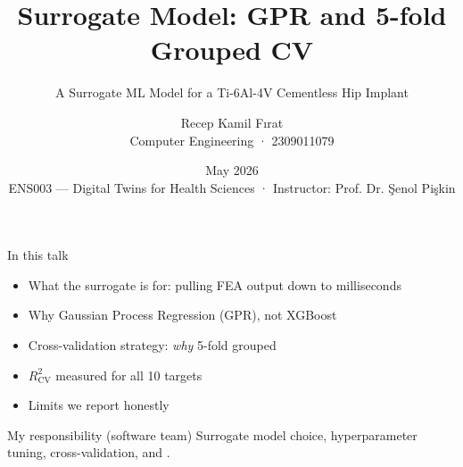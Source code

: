 

\newcommand{\courseHeader}{ENS003 --- Digital Twins for Health Sciences}
\newcommand{\courseSubheader}{Istinye University · Faculty of Engineering and Natural Sciences}
\newcommand{\instructor}{Instructor: Prof. Dr. Şenol Pişkin}
\newcommand{\projectTitle}{A Surrogate ML Model for a Ti-6Al-4V Cementless Hip Implant}

\title{Surrogate Model: GPR and 5-fold Grouped CV}
\subtitle{\projectTitle}
\author{Recep Kamil Fırat \\ \small Computer Engineering · 2309011079}
\date{May 2026 \\ \scriptsize \courseHeader{} · \instructor}



\maketitle

\begin{frame}{In this talk}
  \begin{itemize}
    \item What the surrogate is for: pulling FEA output down to milliseconds
    \item Why Gaussian Process Regression (GPR), not XGBoost
    \item Cross-validation strategy: \textit{why} 5-fold grouped
    \item \(R^2_{\text{CV}}\) measured for all 10 targets
    \item Limits we report honestly
  \end{itemize}
  \vspace{0.4cm}
  \begin{block}{My responsibility (software team)}
    Surrogate model choice, hyperparameter tuning, cross-validation,
     and .
  \end{block}
\end{frame}

